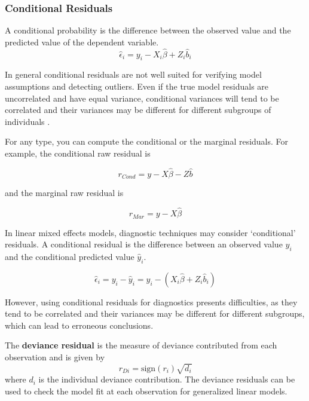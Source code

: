 \documentclass[12pt, a4paper]{report}
\theoremstyle{plain}
\theoremstyle{definition}
\theoremstyle{remark}
\begin{document}
	
	\subsubsection{Conditional Residuals}
	A conditional probability is the difference between the observed value and the predicted value of the dependent variable.
	\begin{equation*}
	\hat{\epsilon}_{i} = y_{i} - X_{i}\hat{\beta} + Z_{i}\hat{b}_{i}
	\end{equation*}
	
	In general conditional residuals are not well suited for verifying model assumptions and detecting outliers. Even if the true model residuals are uncorrelated and have equal variance, conditional variances will tend to be correlated and their variances may be different for different subgroups of individuals \citep{west}.
	
	
	
	
	For any type, you can compute the conditional or the marginal residuals. For example, the conditional raw residual is
	
	
	\[ r_{Cond} = y - X \hat{\beta} - Z \hat{b} \]
	
	and the marginal raw residual is
	
	
	
	\[ r_{Mar} = y - X \hat{\beta} \]
	
	
	
	
	In linear mixed effects models, diagnostic techniques may consider `conditional' residuals. A conditional residual is the difference between an observed value $y_{i}$ and the conditional predicted value $\hat{y}_{i} $.
	
	\[ \hat{\epsilon}_{i} = y_{i} - \hat{y}_{i} = y_{i} - ( X_{i}\hat{\beta} + Z_{i}\hat{b}_{i}) \]
	
	However, using conditional residuals for diagnostics presents difficulties, as they tend to be correlated and their variances may be different for different subgroups, which can lead to erroneous conclusions.
	
	
	
	
	
	
	
	The \textbf{deviance residual} is the measure of deviance contributed from each observation and is given by
	\[r_{Di} = \textrm{sign}( r_{i})
	\sqrt{ d_{i}}\]
	where $d_i$ is the individual deviance contribution.
	The deviance residuals can be used to check the model fit at each observation for generalized linear models. 
	
\end{document}
